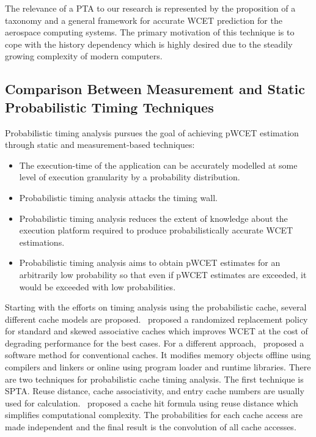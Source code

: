 The relevance of a PTA to our research is represented by the proposition of a taxonomy and a general framework for accurate WCET prediction for the aerospace computing systems. The primary motivation of this technique is to cope with the history dependency which is highly desired due to the steadily growing complexity of modern computers.


\subsection{Comparison Between Measurement and Static Probabilistic Timing Techniques}
\label{properties}

Probabilistic timing analysis pursues the goal of achieving \small{p}WCET estimation through static and measurement-based techniques: 
\begin{itemize}
\item {The execution-time of the application can be accurately modelled at some level of execution granularity by a probability distribution}. 
\item {Probabilistic timing analysis attacks the timing wall}.
\item {Probabilistic timing analysis reduces the extent of knowledge about the execution platform required to produce probabilistically accurate WCET estimations}.
\item {Probabilistic timing analysis aims to obtain pWCET estimates for an arbitrarily low probability so that even if pWCET estimates are exceeded, it would be exceeded with low probabilities}.
\end{itemize}





Starting with the efforts on timing analysis using the probabilistic cache, several different cache models are proposed.~\cite{quinones2009using} proposed a randomized replacement policy for standard and skewed associative caches which improves WCET at the cost of degrading performance for the best cases. For a different approach,~\cite{kosmidis2014measurement} proposed a software method for
conventional caches. It modifies memory objects offline using  compilers and linkers or
online using program loader and runtime libraries.
There are two techniques for probabilistic cache timing analysis. The first technique is SPTA. Reuse distance, cache associativity, and entry cache numbers are usually used for calculation.~\cite{zhou:spta} proposed a cache hit formula using reuse distance which simplifies computational complexity. The probabilities for each cache
access are made independent and the final result is the convolution of all cache accesses.


